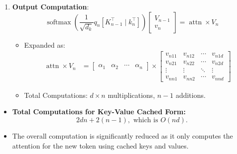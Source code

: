 \documentclass[times, review, 10pt]{elsarticle}
\begin{document}
\begin{enumerate}
\begin{itemize}
        \item Total Computations: \(d \times n\) multiplications, \(n-1\) additions.
    \end{itemize}

    \item[3.] \textbf{Output Computation}:
    \begin{equation}
    \label{eq:app-kv-output}
    \operatorname{softmax}\left(\frac{1}{\sqrt{d_k}} q_n\left[K_{n-1}^{\top} \mid k_n^{\top}\right]\right)
    \left[
    \begin{array}{c}
    V_{n-1} \\
    v_n
    \end{array}
    \right]
    =
    \operatorname{attn} \times V_n
    \end{equation}

    \begin{itemize}
        \item Expanded as:
        \begin{align}
            \operatorname{attn} \times V_n &=  %
            \begin{bmatrix}
                \alpha_1 & \alpha_2 & \cdots & \alpha_n
            \end{bmatrix}
            \times
            \begin{bmatrix}
                v_{n11} & v_{n12} & \cdots & v_{n1d} \\
                v_{n21} & v_{n22} & \cdots & v_{n2d} \\
                \vdots & \vdots & \ddots & \vdots \\
                v_{nn1} & v_{nn2} & \cdots & v_{nnd}
            \end{bmatrix}
            \label{eq:app-kv-output-expand}
        \end{align}

        \item Total Computations: \(d \times n\) multiplications, \(n-1\) additions.
    \end{itemize}
\end{enumerate}

\begin{itemize}
    \item \textbf{Total Computations for Key-Value Cached Form:}
    \begin{equation}
    \label{eq:app-kv-total}
    2dn + 2(n-1), \text{ which is } O(nd).
    \end{equation}
    \item The overall computation is significantly reduced as it only computes the attention for the new token using cached keys and values.
\end{itemize}
\end{document}
